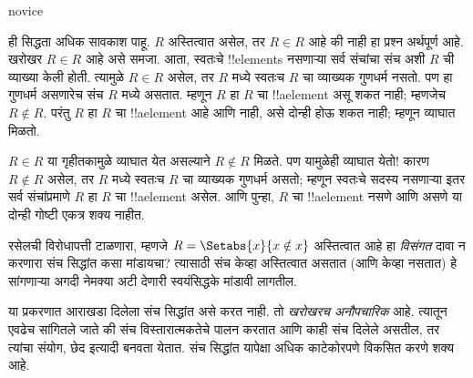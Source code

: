 \documentclass[../../../include/open-logic-section]{subfiles}
\begin{document}
\begin{tagblock}{novice}
\begin{explain}
ही सिद्धता अधिक सावकाश पाहू. $R$ अस्तित्वात असेल, तर $R \in
R$ आहे की नाही हा प्रश्न अर्थपूर्ण आहे. खरोखर $R \in R$ आहे असे समजा.
आता, स्वतःचे !!{element}s नसणाऱ्या सर्व संचांचा संच अशी $R$ ची व्याख्या केली होती.
त्यामुळे $R \in R$ असेल, तर $R$ मध्ये स्वतःच $R$ चा व्याख्यक गुणधर्म नसतो.
पण हा गुणधर्म असणारेच संच $R$ मध्ये असतात. म्हणून $R$ हा $R$ चा
!!a{element} असू शकत नाही; म्हणजेच $R \notin R$.
परंतु $R$ हा $R$ चा !!a{element} आहे आणि नाही, असे दोन्ही होऊ शकत नाही;
म्हणून व्याघात मिळतो.

$R \in R$ या गृहीतकामुळे व्याघात येत असल्याने $R \notin R$ मिळते.
पण यामुळेही व्याघात येतो!{} कारण $R
\notin R$ असेल, तर $R$ मध्ये स्वतःच $R$ चा व्याख्यक गुणधर्म असतो;
म्हणून स्वतःचे सदस्य नसणाऱ्या इतर सर्व संचांप्रमाणे $R$ हा $R$ चा
!!a{element} असेल. आणि पुन्हा, $R$ चा !!a{element} नसणे आणि असणे
या दोन्ही गोष्टी एकत्र शक्य नाहीत.
\end{explain}
\end{tagblock}

\begin{digress}
रसेलची विरोधापत्ती टाळणारा, म्हणजे $R = \Setabs{x}{x \notin x}$
अस्तित्वात आहे हा \emph{विसंगत} दावा न करणारा संच सिद्धांत कसा मांडायचा?
त्यासाठी संच केव्हा अस्तित्वात असतात (आणि केव्हा नसतात) हे सांगणाऱ्या
अगदी नेमक्या अटी देणारी स्वयंसिद्धके मांडावी लागतील.

या प्रकरणात आराखडा दिलेला संच सिद्धांत असे करत नाही. तो
\emph{खरोखरच अनौपचारिक} आहे. त्यातून एवढेच सांगितले जाते की संच
विस्तारात्मकतेचे पालन करतात आणि काही संच दिलेले असतील, तर त्यांचा संयोग,
छेद इत्यादी बनवता येतात. संच सिद्धांत यापेक्षा अधिक काटेकोरपणे विकसित करणे
शक्य आहे. 
\end{digress}
\end{document}
